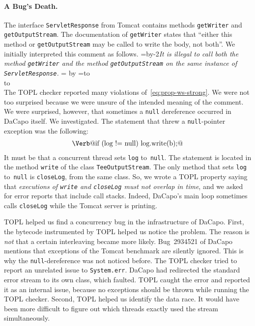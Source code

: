 \documentclass{article} %
\newcommand{\quoteindent}{1.5\parindent} %
\newcommand{\eqquote}[2]{{%
  \refstepcounter{equation}\label{#2}%
  \newdimen\qi\qi=\quoteindent
  \setbox0=\vbox{\advance\hsize by-2\qi\noindent\em#1}%
  \newdimen\x\x=\ht0 \advance\x by\dp0%
  \setbox1=\vbox to\x{\vss\hbox{(\arabic{equation})}\vss}%
  \leavevmode\\[1ex]%
  \hbox to\hsize{\hskip\qi\box0\hfil\box1}%
  \\[1ex]}}
\theoremstyle{definition}
\theoremstyle{remark}
\begin{document}
\paragraph{A Bug's Death.} %

The interface \texttt{ServletResponse} from Tomcat contains methods \texttt{getWriter} and \texttt{getOutputStream}.
The documentation of \texttt{getWriter} states that ``either this method or \texttt{getOutputStream} may be called to write the body, not both''.
We initially interpreted this comment as follows.
\eqquote{It is illegal to call both the method {\tt getWriter} and the method {\tt getOutputStream} on the same instance of {\tt ServletResponse}.}{eq:prop-ws-strong}
The TOPL checker reported many violations of~\eqref{eq:prop-ws-strong}.
We were not too surprised because we were unsure of the intended meaning of the comment.
We were surprised, however, that sometimes a {\tt null} dereference occurred in DaCapo itself.
We investigated.
The statement that threw a {\tt null}-pointer exception was the following:
\begin{align}\label{eq:npe-src}
\text{\Verb@if (log != null) log.write(b);@}
\end{align}
It must be that a concurrent thread sets {\tt log} to~{\tt null}.
The statement is located in the method {\tt write} of the class {\tt TeeOutputStream}.
The only method that sets {\tt log} to~{\tt null} is {\tt closeLog}, from the same class.
So, we wrote a TOPL property saying that \textit{executions of {\tt write} and {\tt closeLog} must not overlap in time}, and we asked for error reports that include call stacks.
Indeed, DaCapo's main loop sometimes calls {\tt closeLog} while the Tomcat server is printing.

TOPL helped us find a concurrency bug in the infrastructure of DaCapo.
First, the bytecode instrumented by TOPL helped us notice the problem.
The reason is \emph{not} that a certain interleaving became more likely.
Bug~2934521 of DaCapo mentions that exceptions of the Tomcat benchmark are silently ignored.
This is why the {\tt null}-dereference was not noticed before.
The TOPL checker tried to report an unrelated issue to {\tt System.err}.
DaCapo had redirected the standard error stream to its own class, which faulted.
TOPL caught the error and reported it as an internal issue, because no exceptions should be thrown while running the TOPL checker.
Second, TOPL helped us identify the data race.
It would have been more difficult to figure out which threads exactly used the stream simultaneously.
\end{document}
